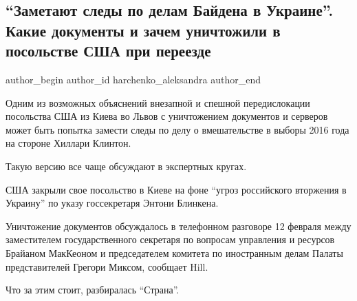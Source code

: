  
 
 
 
 
 
\subsection{\enquote{Заметают следы по делам Байдена в Украине}. Какие документы и зачем уничтожили в посольстве США при переезде}
\label{sec:18_02_2022.stz.news.ua.strana.1.dokumenty_usa_posolstvo_kiev}
 
\ifcmt
 author_begin
   author_id harchenko_aleksandra
 author_end
\fi

Одним из возможных объяснений внезапной и спешной передислокации посольства США
из Киева во Львов с уничтожением документов и серверов может быть попытка
замести следы по делу о вмешательстве в выборы 2016 года на стороне Хиллари
Клинтон.


Такую версию все чаще обсуждают в экспертных кругах.

США закрыли свое посольство в Киеве на фоне \enquote{угроз российского
вторжения в Украину} по указу госсекретаря Энтони Блинкена.  

Уничтожение документов обсуждалось в телефонном разговоре 12 февраля между
заместителем государственного секретаря по вопросам управления и ресурсов
Брайаном МакКеоном и председателем комитета по иностранным делам Палаты
представителей Грегори Миксом, сообщает Hill.

Что за этим стоит, разбиралась \enquote{Страна}.

